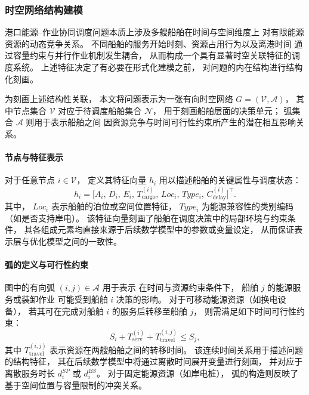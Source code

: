 \documentclass[UTF8, a4paper, 12pt]{ctexart}
\begin{document}
\subsubsection{时空网络结构建模}

港口能源--作业协同调度问题本质上涉及多艘船舶在时间与空间维度上
对有限能源资源的动态竞争关系。
不同船舶的服务开始时刻、资源占用行为以及离港时间
通过容量约束与并行作业机制发生耦合，
从而构成一个具有显著时空关联特征的调度系统。
上述特征决定了有必要在形式化建模之前，
对问题的内在结构进行结构化刻画。

为刻画上述结构性关联，
本文将问题表示为一张有向时空网络
$G=(\mathcal{V},\mathcal{A})$，
其中节点集合 $\mathcal{V}$ 对应于待调度船舶集合 $\mathcal{N}$，
用于刻画船舶层面的决策单元；
弧集合 $\mathcal{A}$ 则用于表示船舶之间
因资源竞争与时间可行性约束所产生的潜在相互影响关系。

\paragraph{节点与特征表示}
对于任意节点 $i\in\mathcal{V}$，
定义其特征向量 $h_i$ 用以描述船舶的关键属性与调度状态：
\begin{equation}
h_i =
\big[
A_i,\,
D_i,\,
E_i,\,
T^{(i)}_{\text{cargo}},\,
Loc_i,\,
Type_i,\,
C^{(i)}_{\text{delay}}
\big]^{\top}.
\end{equation}
其中，
$Loc_i$ 表示船舶的泊位或空间位置特征，
$Type_i$ 为能源兼容性的类别编码（如是否支持岸电）。
该特征向量刻画了船舶在调度决策中的局部环境与约束条件，
其各组成元素均直接来源于后续数学模型中的参数或变量设定，
从而保证表示层与优化模型之间的一致性。

\paragraph{弧的定义与可行性约束}
图中的有向弧 $(i,j)\in\mathcal{A}$ 用于表示
在时间与资源约束条件下，
船舶 $j$ 的能源服务或装卸作业
可能受到船舶 $i$ 决策的影响。
对于可移动能源资源（如换电设备），
若其可在完成对船舶 $i$ 的服务后转移至船舶 $j$，
则需满足如下时间可行性约束：
\begin{equation}
S_i + T^{(i)}_{\text{serv}} + T^{(i,j)}_{\text{travel}} \le S_j ,
\end{equation}
其中 $T^{(i,j)}_{\text{travel}}$ 表示资源在两艘船舶之间的转移时间。
该连续时间关系用于描述问题的结构特征，
其在后续数学模型中将通过离散时间展开变量进行刻画，
并对应于离散服务时长 $d_i^{SP}$ 或 $d_i^{BS}$。
对于固定能源资源（如岸电桩），
弧的构造则反映了基于空间位置与容量限制的冲突关系。
\end{document}

